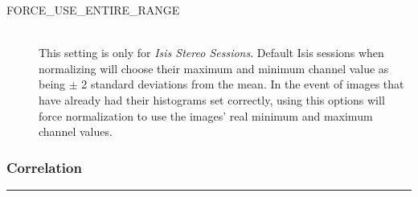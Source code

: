 \begin{description}
\item[FORCE\_USE\_ENTIRE\_RANGE] \hfill \\ This setting is only for
  \emph{Isis Stereo Sessions}. Default Isis sessions when normalizing
  will choose their maximum and minimum channel value as being $\pm$ 2
  standard deviations from the mean. In the event of images that have
  already had their histograms set correctly, using this options will
  force normalization to use the images' real minimum and maximum
  channel values.

\end{description}

\subsubsection*{Correlation}
\hrule
\bigskip

